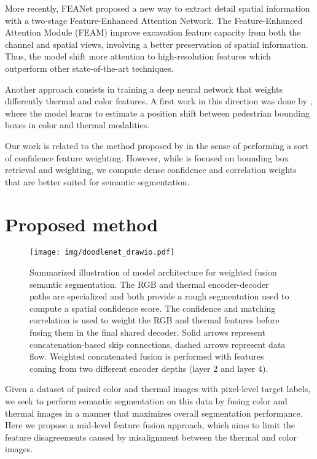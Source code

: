 \documentclass[10pt,twocolumn,letterpaper]{article}
\begin{document}
More recently, FEANet \cite{DBLP:journals/corr/abs-2110-08988} proposed a new way to extract detail spatial information with a two-stage Feature-Enhanced Attention Network. The Feature-Enhanced Attention Module (FEAM) improve excavation feature capacity from both the channel and spatial views, involving a better preservation of spatial information. Thus, the model shift more attention to high-resolution features which outperform other state-of-the-art techniques.

Another approach consists in training a deep neural network that weights differently thermal and color features. A first work in this direction was done by \cite{DBLP:conf/iccv/ZhangZC0LL19}, where the model learns to estimate a position shift between pedestrian bounding boxes in color and thermal modalities.

Our work is related to the method proposed by \cite{DBLP:conf/iccv/ZhangZC0LL19} in the sense of performing a sort of confidence feature weighting. However, while \cite{DBLP:conf/iccv/ZhangZC0LL19} is focused on bounding box retrieval and weighting, we compute dense confidence and correlation weights that are better suited for semantic segmentation.

\section{Proposed method}

\begin{figure*}[t]
\texttt{[image: img/doodlenet\_drawio.pdf]}
\centering
\caption{Summarized illustration of model architecture for weighted fusion semantic segmentation. The RGB and thermal encoder-decoder paths are specialized and both provide a rough segmentation used to compute a spatial confidence score. The confidence and matching correlation is used to weight the RGB and thermal features before fusing them in the final shared decoder. Solid arrows represent concatenation-based skip connections, dashed arrows represent data flow. 
Weighted concatenated fusion is performed with features coming from two different encoder depths (layer 2 and layer 4). }
\label{fig:model}
\end{figure*}

Given a dataset of paired color and thermal images with pixel-level target labels, we seek to perform semantic segmentation on this data by fusing color and thermal images in a manner that maximizes overall segmentation performance. Here we propose a mid-level feature fusion approach, which aims to limit the feature disagreements caused by misalignment between the thermal and color images.
\end{document}
